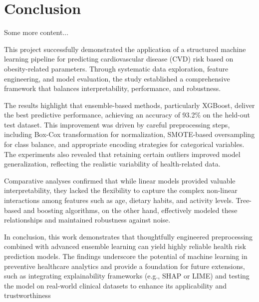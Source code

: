 
    {
    \let\clearpage\relax
    \let\cleardoublepage\relax


    \chapter{Conclusion}
    Some more content...
}

This project successfully demonstrated the application of a structured machine learning pipeline for predicting cardiovascular disease (CVD) risk based on obesity-related parameters.
Through systematic data exploration, feature engineering, and model evaluation, the study established a comprehensive framework that balances interpretability, performance, and robustness.

The results highlight that ensemble-based methods, particularly XGBoost, deliver the best predictive performance, achieving an accuracy of 93.2\% on the held-out test dataset.
This improvement was driven by careful preprocessing steps, including Box-Cox transformation for normalization, SMOTE-based oversampling for class balance, and appropriate encoding strategies for categorical variables.
The experiments also revealed that retaining certain outliers improved model generalization, reflecting the realistic variability of health-related data.

Comparative analyses confirmed that while linear models provided valuable interpretability, they lacked the flexibility to capture the complex non-linear interactions among features such as age, dietary habits, and activity levels.
Tree-based and boosting algorithms, on the other hand, effectively modeled these relationships and maintained robustness against noise.

In conclusion, this work demonstrates that thoughtfully engineered preprocessing combined with advanced ensemble learning can yield highly reliable health risk prediction models.
The findings underscore the potential of machine learning in preventive healthcare analytics and provide a foundation for future extensions, such as integrating explainability frameworks (e.g., SHAP or LIME) and testing the model on real-world clinical datasets to enhance its applicability and trustworthiness